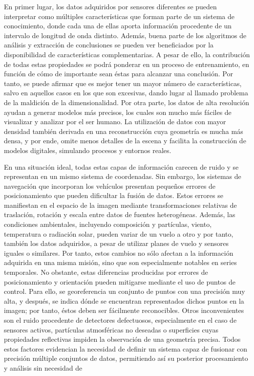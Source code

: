 En primer lugar, los datos adquiridos por sensores diferentes se pueden interpretar como múltiples características que forman parte de un sistema de conocimiento, donde cada una de ellas aporta información procedente de un intervalo de longitud de onda distinto. Además, buena parte de los algoritmos de análisis y extracción de conclusiones se pueden ver beneficiados por la disponibilidad de características complementarias. A pesar de ello, la contribución de todas estas propiedades se podrá ponderar en un proceso de entrenamiento, en función de cómo de importante sean éstas para alcanzar una conclusión. Por tanto, se puede afirmar que es mejor tener un mayor número de características, salvo en aquellos casos en los que son excesivas, dando lugar al llamado problema de la maldición de la dimensionalidad. Por otra parte, los datos de alta resolución ayudan a generar modelos más precisos, los cuales son mucho más fáciles de visualizar y analizar por el ser humano. La utilización de datos con mayor densidad también derivada en una reconstrucción cuya geometría es mucha más densa, y por ende, omite menos detalles de la escena y facilita la construcción de modelos digitales, simulando procesos y entornos reales. 

En una situación ideal, todas estas capas de información carecen de ruido y se representan en un mismo sistema de coordenadas. Sin embargo, los sistemas de navegación que incorporan los vehículos presentan pequeños errores de posicionamiento que pueden dificultar la fusión de datos. Estos errores se manifiestan en el espacio de la imagen mediante transformaciones relativas de traslación, rotación y escala entre datos de fuentes heterogéneas. Además, las condiciones ambientales, incluyendo composición y partículas, viento, temperatura o radiación solar, pueden variar de un vuelo a otro y por tanto, también los datos adquiridos, a pesar de utilizar planes de vuelo y sensores iguales o similares. Por tanto, estos cambios no sólo afectan a la información adquirida en una misma misión, sino que son especialmente notables en series temporales. No obstante, estas diferencias producidas por errores de posicionamiento y orientación pueden mitigarse mediante el uso de puntos de control. Para ello, se georeferencia un conjunto de puntos con una precisión muy alta, y después, se indica dónde se encuentran representados dichos puntos en la imagen; por tanto, éstos deben ser fácilmente reconocibles. Otros inconvenientes son el ruido procedente de detectores defectuosos, especialmente en el caso de sensores activos, partículas atmosféricas no deseadas o superficies cuyas propiedades reflectivas impiden la observación de una geometría precisa. Todos estos factores evidencian la necesidad de definir un sistema capaz de fusionar con precisión múltiple conjuntos de datos, permitiendo así su posterior procesamiento y análisis sin necesidad de  

